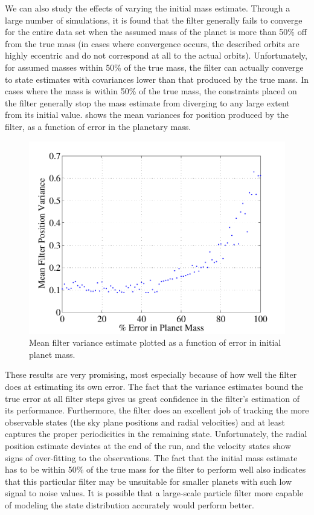 We can also study the effects of varying the initial mass estimate.  Through a large number of simulations, it is found that the filter generally fails to converge for the entire data set when the assumed mass of the planet is more than 50\% off from the true mass (in cases where convergence occurs, the described orbits are highly eccentric and do not correspond at all to the actual orbits).  Unfortunately, for assumed masses within 50\% of the true mass, the filter can actually converge to state estimates with covariances lower than that produced by the true mass.  In cases where the mass is within 50\% of the true mass, the constraints placed on the filter generally stop the mass estimate from diverging to any large extent from its initial value.   shows the mean variances for position produced by the filter, as a function of error in the planetary mass.
\begin{figure}[ht]
 \begin{center}
   \includegraphics[width=4.5in,clip=true,trim=0.1in 0in 0.1in 0in]{./figures/filtVar_v_Err} 
 \end{center}
 \caption[Mean filter variance for increasing planet mass error]{ \label{fig:filtVar} Mean filter variance estimate plotted as a function of error in initial planet mass.}
\end{figure}

These results are very promising, most especially because of how well the filter does at estimating its own error.  The fact that the variance estimates bound the true error at all filter steps gives us great confidence in the filter's estimation of its performance.  Furthermore, the filter does an excellent job of tracking the more observable states (the sky plane positions and radial velocities) and at least captures the proper periodicities in the remaining state.  Unfortunately, the radial position estimate deviates at the end of the run, and the velocity states show signs of over-fitting to the observations.  The fact that the initial mass estimate has to be within 50\% of the true mass for the filter to perform well also indicates that this particular filter may be unsuitable for smaller planets with such low signal to noise values.  It is possible that a large-scale particle filter more capable of modeling the state distribution accurately would perform better.

